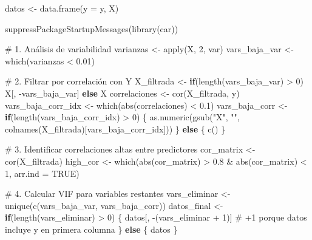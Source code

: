 \documentclass[
  letterpaper,
  DIV=11,
  numbers=noendperiod]{scrreprt}
\newenvironment{Shaded}{\begin{snugshade}}{\end{snugshade}}
\newcommand{\AttributeTok}[1]{\textcolor[rgb]{0.40,0.45,0.13}{#1}}
\newcommand{\CommentTok}[1]{\textcolor[rgb]{0.37,0.37,0.37}{#1}}
\newcommand{\ConstantTok}[1]{\textcolor[rgb]{0.56,0.35,0.01}{#1}}
\newcommand{\ControlFlowTok}[1]{\textcolor[rgb]{0.00,0.23,0.31}{\textbf{#1}}}
\newcommand{\DecValTok}[1]{\textcolor[rgb]{0.68,0.00,0.00}{#1}}
\newcommand{\FloatTok}[1]{\textcolor[rgb]{0.68,0.00,0.00}{#1}}
\newcommand{\FunctionTok}[1]{\textcolor[rgb]{0.28,0.35,0.67}{#1}}
\newcommand{\NormalTok}[1]{\textcolor[rgb]{0.00,0.23,0.31}{#1}}
\newcommand{\OtherTok}[1]{\textcolor[rgb]{0.00,0.23,0.31}{#1}}
\newcommand{\SpecialCharTok}[1]{\textcolor[rgb]{0.37,0.37,0.37}{#1}}
\newcommand{\StringTok}[1]{\textcolor[rgb]{0.13,0.47,0.30}{#1}}
\begin{document}
\begin{tcolorbox}
\begin{Shaded}
\begin{Highlighting}[]
\NormalTok{datos }\OtherTok{\textless{}{-}} \FunctionTok{data.frame}\NormalTok{(}\AttributeTok{y =}\NormalTok{ y, X)}

\FunctionTok{suppressPackageStartupMessages}\NormalTok{(}\FunctionTok{library}\NormalTok{(car))}

\CommentTok{\# 1. Análisis de variabilidad}
\NormalTok{varianzas }\OtherTok{\textless{}{-}} \FunctionTok{apply}\NormalTok{(X, }\DecValTok{2}\NormalTok{, var)}
\NormalTok{vars\_baja\_var }\OtherTok{\textless{}{-}} \FunctionTok{which}\NormalTok{(varianzas }\SpecialCharTok{\textless{}} \FloatTok{0.01}\NormalTok{)}

\CommentTok{\# 2. Filtrar por correlación con Y}
\NormalTok{X\_filtrada }\OtherTok{\textless{}{-}} \ControlFlowTok{if}\NormalTok{(}\FunctionTok{length}\NormalTok{(vars\_baja\_var) }\SpecialCharTok{\textgreater{}} \DecValTok{0}\NormalTok{) X[, }\SpecialCharTok{{-}}\NormalTok{vars\_baja\_var] }\ControlFlowTok{else}\NormalTok{ X}
\NormalTok{correlaciones }\OtherTok{\textless{}{-}} \FunctionTok{cor}\NormalTok{(X\_filtrada, y)}
\NormalTok{vars\_baja\_corr\_idx }\OtherTok{\textless{}{-}} \FunctionTok{which}\NormalTok{(}\FunctionTok{abs}\NormalTok{(correlaciones) }\SpecialCharTok{\textless{}} \FloatTok{0.1}\NormalTok{)}
\NormalTok{vars\_baja\_corr }\OtherTok{\textless{}{-}} \ControlFlowTok{if}\NormalTok{(}\FunctionTok{length}\NormalTok{(vars\_baja\_corr\_idx) }\SpecialCharTok{\textgreater{}} \DecValTok{0}\NormalTok{) \{}
  \FunctionTok{as.numeric}\NormalTok{(}\FunctionTok{gsub}\NormalTok{(}\StringTok{"X"}\NormalTok{, }\StringTok{""}\NormalTok{, }\FunctionTok{colnames}\NormalTok{(X\_filtrada)[vars\_baja\_corr\_idx]))}
\NormalTok{\} }\ControlFlowTok{else}\NormalTok{ \{}
  \FunctionTok{c}\NormalTok{()}
\NormalTok{\}}

\CommentTok{\# 3. Identificar correlaciones altas entre predictores}
\NormalTok{cor\_matrix }\OtherTok{\textless{}{-}} \FunctionTok{cor}\NormalTok{(X\_filtrada)}
\NormalTok{high\_cor }\OtherTok{\textless{}{-}} \FunctionTok{which}\NormalTok{(}\FunctionTok{abs}\NormalTok{(cor\_matrix) }\SpecialCharTok{\textgreater{}} \FloatTok{0.8} \SpecialCharTok{\&} \FunctionTok{abs}\NormalTok{(cor\_matrix) }\SpecialCharTok{\textless{}} \DecValTok{1}\NormalTok{, }\AttributeTok{arr.ind =} \ConstantTok{TRUE}\NormalTok{)}

\CommentTok{\# 4. Calcular VIF para variables restantes}
\NormalTok{vars\_eliminar }\OtherTok{\textless{}{-}} \FunctionTok{unique}\NormalTok{(}\FunctionTok{c}\NormalTok{(vars\_baja\_var, vars\_baja\_corr))}
\NormalTok{datos\_final }\OtherTok{\textless{}{-}} \ControlFlowTok{if}\NormalTok{(}\FunctionTok{length}\NormalTok{(vars\_eliminar) }\SpecialCharTok{\textgreater{}} \DecValTok{0}\NormalTok{) \{}
\NormalTok{  datos[, }\SpecialCharTok{{-}}\NormalTok{(vars\_eliminar }\SpecialCharTok{+} \DecValTok{1}\NormalTok{)] }\CommentTok{\# +1 porque datos incluye y en primera columna}
\NormalTok{\} }\ControlFlowTok{else}\NormalTok{ \{}
\NormalTok{  datos}
\NormalTok{\}}


\end{Highlighting}
\end{Shaded}
\end{tcolorbox}
\end{document}
